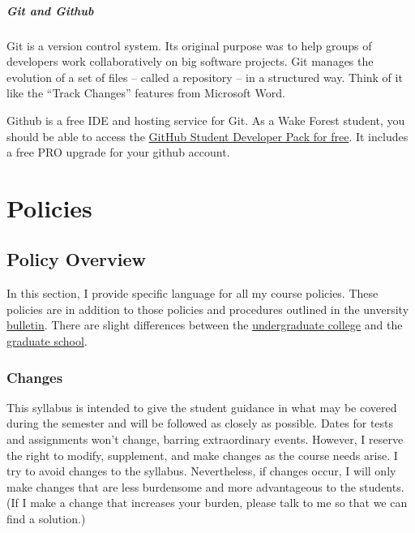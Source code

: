 \documentclass[
]{book}
\begin{document}
\hypertarget{git-and-github}{%
\subsubsection{Git and Github}\label{git-and-github}}

Git is a version control system. Its original purpose was to help groups of developers work collaboratively on big software projects. Git manages the evolution of a set of files -- called a repository -- in a structured way. Think of it like the ``Track Changes'' features from Microsoft Word.

Github is a free IDE and hosting service for Git. As a Wake Forest student, you should be able to access the \href{https://education.github.com/benefits?type=student}{GitHub Student Developer Pack for free}. It includes a free PRO upgrade for your github account.

\hypertarget{part-policies}{%
\part*{Policies}\label{part-policies}}

\hypertarget{policy-overview}{%
\chapter{Policy Overview}\label{policy-overview}}

In this section, I provide specific language for all my course policies. These policies are in addition to those policies and procedures outlined in the unversity \href{https://bulletin.wfu.edu}{bulletin}. There are slight differences between the \href{https://bulletin.wfu.edu/undergraduate/}{undergraduate college} and the \href{https://bulletin.wfu.edu/graduate/}{graduate school}.

\hypertarget{changes}{%
\section{Changes}\label{changes}}

This syllabus is intended to give the student guidance in what may be covered during the semester and will be followed as closely as possible.
Dates for tests and assignments won't change, barring extraordinary events.
However, I reserve the right to modify, supplement, and make changes as the course needs arise.
I try to avoid changes to the syllabus.
Nevertheless, if changes occur, I will only make changes that are less burdensome and more advantageous to the students.
(If I make a change that increases your burden, please talk to me so that we can find a solution.)
\end{document}
